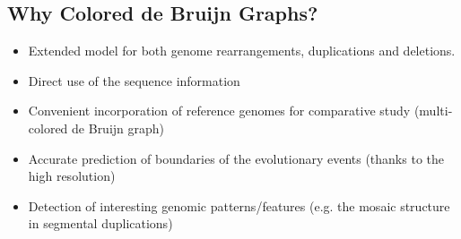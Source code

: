 \documentclass[12pt]{article}
\begin{document}
\subsection{Why Colored de Bruijn Graphs?}
\begin{itemize}
 \item Extended model for both genome rearrangements, duplications and deletions. 
 \item Direct use of the sequence information
 \item Convenient incorporation of reference genomes for comparative study (multi-colored de Bruijn graph)
 \item Accurate prediction of boundaries of the evolutionary events (thanks to the high resolution)
 \item Detection of interesting genomic patterns/features (e.g. the mosaic structure in segmental duplications)
\end{itemize}
\end{document}
